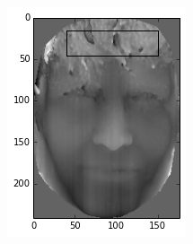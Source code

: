 \begin{figure}[t]
    \centering
    \begin{subfigure}{0.45\columnwidth}
        \centering
        \includegraphics[width=\columnwidth]{images/face1}
        \subcaption{}
        \label{subfig:robust-face1}
    \end{subfigure}
    \hfill
    \begin{subfigure}{0.45\columnwidth}
        \centering

\end{subfigure}
\end{figure}
